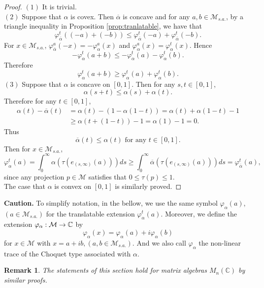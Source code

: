 \documentclass[a4paper,12pt]{amsart}
\newtheorem{remark}[definition]{Remark}
\newcommand{\M}{\mathcal{M}}
\newcommand{\C}{\mathbb{C}}
\begin{document}
\begin{proof}
$(1)$  
It is trivial. \\
$(2)$   Suppose that  $\alpha$ is covex.  Then $\overline{\alpha}$ is concave and 
for any $a, b \in {\M}_{s.a.}$, 
by a triangle inequality in Proposition \ref{prop:tranlatable}, we have that 
$$
\varphi_{\overline{\alpha}}^{t}((-a) +(-b))
 \leq \varphi_{\overline{\alpha}}^{t}(-a) + \varphi_{\overline{\alpha}}^{t}(-b).
$$
For $x \in  \M_{s.a.}$, 
$\varphi_{\overline{\alpha}}^{a}(-x) = - \varphi_{\alpha}^{a}(x) $ 
and  $\varphi_{\alpha}^{a}(x) = \varphi_{\alpha}^{t}(x)$.  
Hence
$$
- \varphi_{\alpha}^{t}(a + b) \leq  -\varphi_{\alpha}^{t}(a)  -\varphi_{\alpha}^{t}(b).
$$
Therefore 
$$
 \varphi_{\alpha}^{t}(a + b) \geq \varphi_{\alpha}^{t}(a) + \varphi_{\alpha}^{t}(b).
$$
$(3)$  Suppose that $\alpha$ is concave on $[0,1]$.  Then for any $s,t \in [0,1]$, 
$$
\alpha(s + t) \leq \alpha(s) + \alpha(t).
$$
Therefore for any $t \in [0,1]$, 
\begin{align*}
\alpha(t) - \overline{\alpha}(t) & = \alpha(t)  - (1 - \alpha(1-t)) = \alpha(t) + \alpha(1-t) -1 \\
& \geq  \alpha(t + (1-t)) -1 = \alpha(1) -1 = 0.
\end{align*}
Thus  
$$
\overline{\alpha}(t) \leq  \alpha(t) \text{ for any }  t \in [0,1]. 
$$
Then for $x \in  \M_{s.a.}$, 
$$
\varphi_{\alpha}^{t}(a)= \int_0^{\infty}  \alpha(\tau(e_{(s,\infty)}(a)))ds  \geq 
\int_0^{\infty} {\overline \alpha}(\tau(e_{(s,\infty)}(a)))ds = 
\varphi_{\overline{\alpha}}^{t}(a), 
$$
since any projection $p \in \M$ satisfies that $0 \leq \tau(p) \leq 1$. \\
The case that $\alpha$ is convex on $[0,1]$ is similarly proved.
\end{proof}

\noindent
{\bf Caution.} To simplify notation, in the bellow, we use the same symbol $\varphi_{\alpha}(a)$, $(a \in {\M}_{s.a.})$ for 
the translatable extension $\varphi_{\alpha}^{t}(a)$. Moreover, we define the extension
$\varphi_{\alpha}: \M \rightarrow \Bbb C$ by 
$$
\varphi_{\alpha}(x) = \varphi_{\alpha}(a) + i \varphi_{\alpha}(b)
$$
for $x \in \M$ with $x = a + ib, (a,b \in {\M}_{s.a.})$.  And we also call $\varphi_{\alpha}$ the non-linear trace of the 
Choquet type associated with $\alpha$. 

\begin{remark} 
The statements of this section hold for matrix algebras $M_n(\C)$ by similar proofs.
\end{remark}
\end{document}
